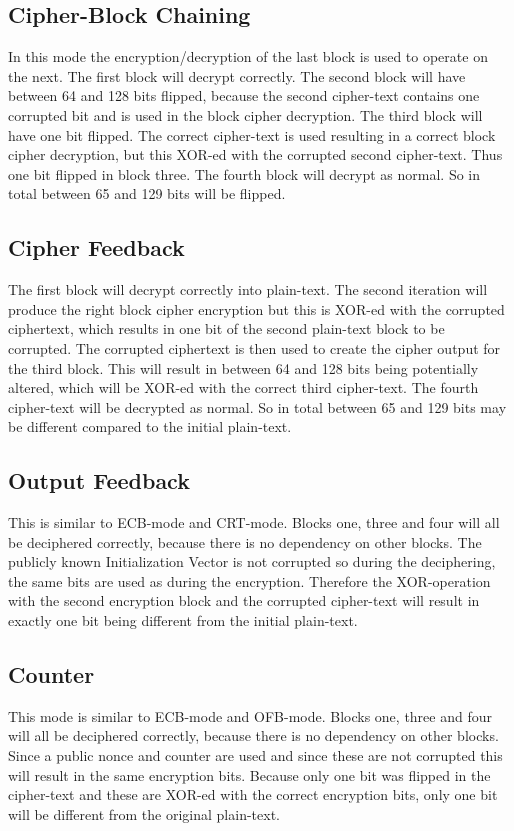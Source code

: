 \documentclass{article}
\begin{document}
\subsection{Cipher-Block Chaining}
In this mode the encryption/decryption of the last block is used to operate on the next.
The first block will decrypt correctly. The second block will have between 64 and 128 bits flipped, because the second cipher-text contains one corrupted bit and is used in the block cipher decryption. The third block will have one bit flipped. The correct cipher-text is used resulting in a correct block cipher decryption, but this XOR-ed with the corrupted second cipher-text. Thus one bit flipped in block three. The fourth block will decrypt as normal.
So in total between 65 and 129 bits will be flipped.

\subsection{Cipher Feedback}
The first block will decrypt correctly into plain-text.
The second iteration will produce the right block cipher encryption but this is XOR-ed with the corrupted ciphertext, which results in one bit of the second plain-text block to be corrupted.
The corrupted ciphertext is then used to create the cipher output for the third block.
This will result in between 64 and 128 bits being potentially altered, which will be XOR-ed with the correct third cipher-text.
The fourth cipher-text will be decrypted as normal.
So in total between 65 and 129 bits may be different compared to the initial plain-text.

\subsection{Output Feedback}
This is similar to ECB-mode and CRT-mode.
Blocks one, three and four will all be deciphered correctly, because there is no dependency on other blocks.
The publicly known Initialization Vector is not corrupted so during the deciphering, the same bits are used as during the encryption.
Therefore the XOR-operation with the second encryption block and the corrupted cipher-text will result in exactly one bit being different from the initial plain-text.

\subsection{Counter}
This mode is similar to ECB-mode and OFB-mode.
Blocks one, three and four will all be deciphered correctly, because there is no dependency on other blocks.
Since a public nonce and counter are used and since these are not corrupted this will result in the same encryption bits.
Because only one bit was flipped in the cipher-text and these are XOR-ed with the correct encryption bits, only one bit will be different from the original plain-text.


%
% 
\end{document}
